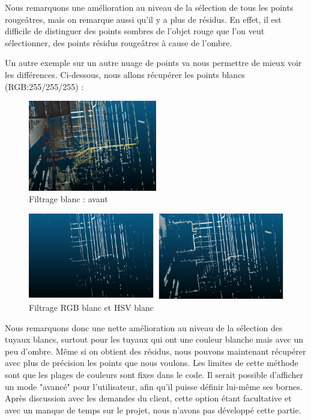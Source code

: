 \documentclass[12pt,titlepage,french]{article}
\begin{document}
Nous remarquons une amélioration au niveau de la sélection de tous les points rougeâtres, mais on remarque aussi qu'il y a plus de résidus. En effet, il est difficile de distinguer des points sombres de l'objet rouge que l'on veut sélectionner, des points résidus rougeâtres à cause de l'ombre. \newline

Un autre exemple sur un autre nuage de points va nous permettre de mieux voir les différences. Ci-dessous, nous allons récupérer les points blancs (RGB:255/255/255) :

\begin{figure}[H]
\center
\includegraphics[width=0.5\textwidth]{./img/1_white.PNG}
\caption{\label{} Filtrage blanc : avant}
\end{figure}

\begin{figure}[H]
\center
\includegraphics[width=1\textwidth]{./img/hsv2_avant_apres.PNG}
\caption{\label{} Filtrage RGB blanc et HSV blanc}
\end{figure}

Nous remarquons donc une nette amélioration au niveau de la sélection des tuyaux blancs, surtout pour les tuyaux qui ont une couleur blanche mais avec un peu d'ombre. Même si on obtient des résidus, nous pouvons maintenant récupérer avec plus de précision les points que nous voulons. Les limites de cette méthode sont que les plages de couleurs sont fixes dans le code. Il serait possible d'afficher un mode "avancé" pour l'utilisateur, afin qu'il puisse définir lui-même ses bornes. Après discussion avec les demandes du client, cette option étant facultative et avec un manque de temps sur le projet, nous n'avons pas développé cette partie.
\end{document}
